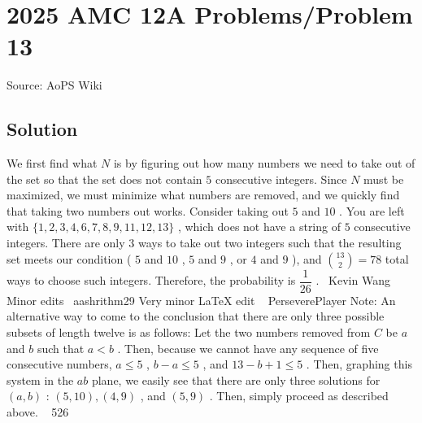 \documentclass[12pt]{article}
\begin{document}
\section*{{2025 AMC 12A Problems/Problem 13}}
Source: AoPS Wiki

\subsection*{Solution}
We first find what $N$ is by figuring out how many numbers we need to take out of the set so that the set does not contain $5$ consecutive integers. Since $N$ must be maximized, we must minimize what numbers are removed, and we quickly find that taking two numbers out works. Consider taking out $5$ and $10$ . You are left with $\{1,2,3,4,6,7,8,9,11,12,13\}$ , which does not have a string of $5$ consecutive integers. There are only $3$ ways to take out two integers such that the resulting set meets our condition ( $5$ and $10$ , $5$ and $9$ , or $4$ and $9$ ), and ${\binom{13}{2}}=78$ total ways to choose such integers. Therefore, the probability is $\boxed{\dfrac{1}{26}}$ . ~Kevin Wang Minor edits ~aashrithm29 Very minor LaTeX edit ~ PerseverePlayer Note: An alternative way to come to the conclusion that there are only three possible subsets of length twelve is as follows: Let the two numbers removed from $C$ be $a$ and $b$ such that $a<b$ . Then, because we cannot have any sequence of five consecutive numbers, $a \leq 5$ , $b-a \leq 5$ , and $13 - b +1\leq 5$ . Then, graphing this system in the $ab$ plane, we easily see that there are only three solutions for $(a,b)$ : $(5,10), (4,9)$ , and $(5,9)$ . Then, simply proceed as described above. ~ 526
\end{document}
